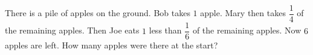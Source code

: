 There is a pile of apples on the ground. Bob takes $1$ apple. Mary then takes $\dfrac14$ of the remaining apples. Then Joe eats $1$ less than $\dfrac16$ of the remaining apples. Now $6$ apples are left. How many apples were there at the start?
